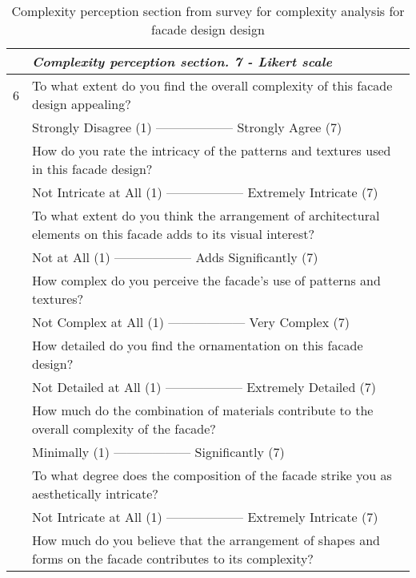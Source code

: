     \begin{table}[htb]
        \centering
        \footnotesize
        \caption{Complexity perception section  from survey for complexity analysis for facade design design}
        \label{tab:ComplexitySurvey}
        \begin{tabularx}{\linewidth}{p{0.125cm}X}
            \toprule
            & \textit{Complexity perception section. 7 - Likert scale} \\
            \midrule
            6 & To what extent do you find the overall complexity of this facade design appealing?\\
            & Strongly Disagree (1) —————— Strongly Agree (7) \\
            \addlinespace
            7 & How do you rate the intricacy of the patterns and textures used in this facade design? \\
            & Not Intricate at All (1) —————— Extremely Intricate (7)\\
            \addlinespace
            8 & To what extent do you think the arrangement of architectural elements on this facade adds to its visual interest? \\
            & Not at All (1) —————— Adds Significantly (7) \\
            \addlinespace
            9 & How complex do you perceive the facade's use of patterns and textures? \\
            & Not Complex at All (1) —————— Very Complex (7) \\
            \addlinespace
            10 & How detailed do you find the ornamentation on this facade design? \\
            & Not Detailed at All (1) —————— Extremely Detailed (7) \\
            \addlinespace
            11 & How much do the combination of materials contribute to the overall complexity of the facade? \\
            & Minimally (1) —————— Significantly (7) \\
            \addlinespace
            12 & To what degree does the composition of the facade strike you as aesthetically intricate? \\
            & Not Intricate at All (1) —————— Extremely Intricate (7) \\
            \addlinespace
            13 & How much do you believe that the arrangement of shapes and forms on the facade contributes to its complexity? \\

\end{tabularx}
\end{table}
